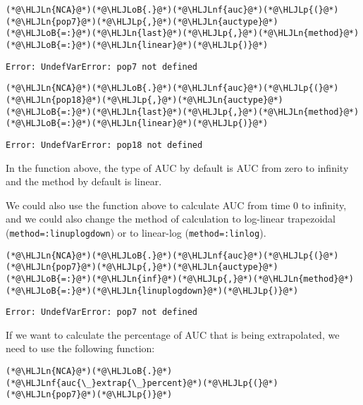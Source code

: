 \documentclass[12pt,a4paper]{article}
\newcommand{\HLJLn}[1]{#1}
\newcommand{\HLJLnf}[1]{\textcolor[RGB]{66,102,213}{#1}}
\newcommand{\HLJLoB}[1]{\textcolor[RGB]{102,102,102}{\textbf{#1}}}
\newcommand{\HLJLp}[1]{#1}
\begin{document}
\begin{lstlisting}
(*@\HLJLn{NCA}@*)(*@\HLJLoB{.}@*)(*@\HLJLnf{auc}@*)(*@\HLJLp{(}@*)(*@\HLJLn{pop7}@*)(*@\HLJLp{,}@*)(*@\HLJLn{auctype}@*)(*@\HLJLoB{=:}@*)(*@\HLJLn{last}@*)(*@\HLJLp{,}@*)(*@\HLJLn{method}@*)(*@\HLJLoB{=:}@*)(*@\HLJLn{linear}@*)(*@\HLJLp{)}@*)
\end{lstlisting}

\begin{lstlisting}
Error: UndefVarError: pop7 not defined
\end{lstlisting}


\begin{lstlisting}
(*@\HLJLn{NCA}@*)(*@\HLJLoB{.}@*)(*@\HLJLnf{auc}@*)(*@\HLJLp{(}@*)(*@\HLJLn{pop18}@*)(*@\HLJLp{,}@*)(*@\HLJLn{auctype}@*)(*@\HLJLoB{=:}@*)(*@\HLJLn{last}@*)(*@\HLJLp{,}@*)(*@\HLJLn{method}@*)(*@\HLJLoB{=:}@*)(*@\HLJLn{linear}@*)(*@\HLJLp{)}@*)
\end{lstlisting}

\begin{lstlisting}
Error: UndefVarError: pop18 not defined
\end{lstlisting}


In the function above, the type of AUC by default is AUC from zero to infinity and the method by default is linear.

We could also use the function above to calculate AUC from time 0 to infinity, and we could also change the method of calculation to log-linear trapezoidal (\texttt{method=:linuplogdown}) or to linear-log (\texttt{method=:linlog}).


\begin{lstlisting}
(*@\HLJLn{NCA}@*)(*@\HLJLoB{.}@*)(*@\HLJLnf{auc}@*)(*@\HLJLp{(}@*)(*@\HLJLn{pop7}@*)(*@\HLJLp{,}@*)(*@\HLJLn{auctype}@*)(*@\HLJLoB{=:}@*)(*@\HLJLn{inf}@*)(*@\HLJLp{,}@*)(*@\HLJLn{method}@*)(*@\HLJLoB{=:}@*)(*@\HLJLn{linuplogdown}@*)(*@\HLJLp{)}@*)
\end{lstlisting}

\begin{lstlisting}
Error: UndefVarError: pop7 not defined
\end{lstlisting}


If we want to calculate the percentage of AUC that is being extrapolated, we need to use the following function:


\begin{lstlisting}
(*@\HLJLn{NCA}@*)(*@\HLJLoB{.}@*)(*@\HLJLnf{auc{\_}extrap{\_}percent}@*)(*@\HLJLp{(}@*)(*@\HLJLn{pop7}@*)(*@\HLJLp{)}@*)
\end{lstlisting}
\end{document}
